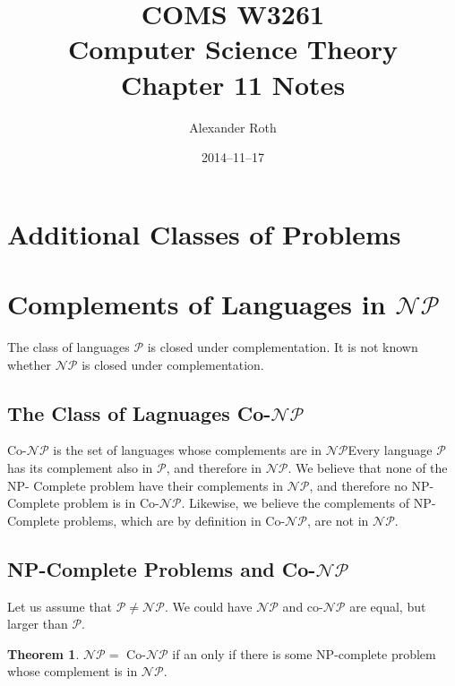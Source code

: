 \documentclass[]{article}
\begin{document}
\title{COMS W3261 \\ Computer Science Theory \\ Chapter 11 Notes}
\author{Alexander Roth}
\date{2014--11--17}
\maketitle
\theoremstyle{definition}
\newtheorem{thm}{Theorem}

\section*{Additional Classes of Problems}
\section*{Complements of Languages in $\mathcal{NP}$}
The class of languages $\mathcal{P}$ is closed under complementation. It is not
known whether $\mathcal{NP}$ is closed under complementation.

\subsection*{The Class of Lagnuages Co-$\mathcal{NP}$}
Co-$\mathcal{NP}$ is the set of languages whose complements are in
$\mathcal{NP}$Every language $\mathcal{P}$ has its complement also in
$\mathcal{P}$, and therefore in $\mathcal{NP}$. We believe that none of the NP-
Complete problem have their complements in $\mathcal{NP}$, and therefore no NP-
Complete problem is in Co-$\mathcal{NP}$. Likewise, we believe the complements
of NP-Complete problems, which are by definition in Co-$\mathcal{NP}$, are not
in $\mathcal{NP}$.

\subsection*{NP-Complete Problems and Co-$\mathcal{NP}$}
Let us assume that $\mathcal{P} \neq \mathcal{NP}$. We could have $\mathcal{NP}$
and co-$\mathcal{NP}$ are equal, but larger than $\mathcal{P}$.
\begin{thm}
$\mathcal{NP} =$ Co-$\mathcal{NP}$ if an only if there is some NP-complete
problem whose complement is in $\mathcal{NP}$.
\end{thm}
\end{document}
